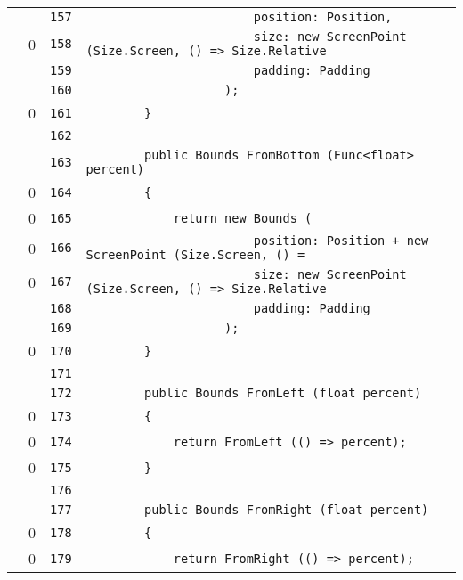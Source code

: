 \documentclass[a4paper,10pt]{article}
\begin{document}
\begin{longtable}[l]{lrrl}
\cellcolor{gray} &  & \verb~157~ & \verb~                       position: Position,~\\
\cellcolor{red} & 0 & \verb~158~ & \verb~                       size: new ScreenPoint (Size.Screen, () => Size.Relative~\\
\cellcolor{gray} &  & \verb~159~ & \verb~                       padding: Padding~\\
\cellcolor{gray} &  & \verb~160~ & \verb~                   );~\\
\cellcolor{red} & 0 & \verb~161~ & \verb~        }~\\
\cellcolor{gray} &  & \verb~162~ & \verb~~\\
\cellcolor{gray} &  & \verb~163~ & \verb~        public Bounds FromBottom (Func<float> percent)~\\
\cellcolor{red} & 0 & \verb~164~ & \verb~        {~\\
\cellcolor{red} & 0 & \verb~165~ & \verb~            return new Bounds (~\\
\cellcolor{red} & 0 & \verb~166~ & \verb~                       position: Position + new ScreenPoint (Size.Screen, () =~\\
\cellcolor{red} & 0 & \verb~167~ & \verb~                       size: new ScreenPoint (Size.Screen, () => Size.Relative~\\
\cellcolor{gray} &  & \verb~168~ & \verb~                       padding: Padding~\\
\cellcolor{gray} &  & \verb~169~ & \verb~                   );~\\
\cellcolor{red} & 0 & \verb~170~ & \verb~        }~\\
\cellcolor{gray} &  & \verb~171~ & \verb~~\\
\cellcolor{gray} &  & \verb~172~ & \verb~        public Bounds FromLeft (float percent)~\\
\cellcolor{red} & 0 & \verb~173~ & \verb~        {~\\
\cellcolor{red} & 0 & \verb~174~ & \verb~            return FromLeft (() => percent);~\\
\cellcolor{red} & 0 & \verb~175~ & \verb~        }~\\
\cellcolor{gray} &  & \verb~176~ & \verb~~\\
\cellcolor{gray} &  & \verb~177~ & \verb~        public Bounds FromRight (float percent)~\\
\cellcolor{red} & 0 & \verb~178~ & \verb~        {~\\
\cellcolor{red} & 0 & \verb~179~ & \verb~            return FromRight (() => percent);~\\

\end{longtable}
\end{document}
